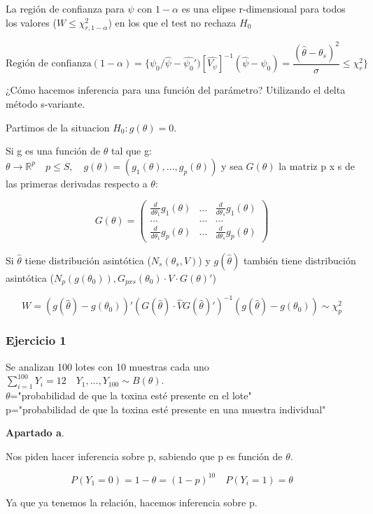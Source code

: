 La región de confianza para $\psi$ con $1-\alpha$ es una elipse r-dimensional para todos los valores ($W \leq \chi^2_{r,1-\alpha}$) en los que el test no rechaza $H_0$

\[
\text{Región de confianza}(1-\alpha)=\{ \psi_0 /\hat{\psi}-\hat{\psi_0}')[\hat{V_\psi}]^{-1}(\hat{\psi}-\psi_0)=\frac{(\hat{\theta}-\theta_s)^2}{\sigma}\leq\chi^2_r\}
\]

¿Cómo hacemos inferencia para una función del parámetro?
Utilizando el delta método s-variante.

Partimos de la situacion $H_0:g(\theta)=0$.

Si g es una función de $\theta$ tal que g:$\theta \to \mathbb{R}^p \quad p \leq S, \quad g(\theta)=(g_1(\theta),\dots,g_p(\theta))$
y sea $G(\theta)$ la matriz p x s de las primeras derivadas respecto a $\theta$:

\[
G(\theta)=
\begin{pmatrix}
    \frac{d}{d \theta_1} g_1(\theta) & \dots & \frac{d}{d \theta_s} g_1(\theta)\\
    \dots &\dots & \dots \\
    \frac{d}{d \theta_1} g_p(\theta) & \dots &\frac{d}{d \theta_s} g_p(\theta)
\end{pmatrix}
\]

Si $\hat{\theta}$ tiene distribución asintótica ($N_s(\theta_s,V)$)
y $g(\hat{\theta})$ también tiene distribución asintótica ($N_p(g(\theta_0)),G_{pxs}(\theta_0)\cdot V \cdot G(\theta)'$)

\[
W=(g(\hat{\theta})-g(\theta_0))'(G(\hat{\theta})\cdot \hat{V} G(\hat{\theta})')^{-1}(g(\hat{\theta})-g(\theta_0)) \sim \chi^2_p
\]

\subsubsection*{Ejercicio 1}
Se analizan 100 lotes con 10 muestras cada uno $\sum_{i=1}^{100}Y_i=12 \quad Y_1,\dots,Y_{100} \sim B(\theta)$.
\\$\theta$="probabilidad de que la toxina esté presente en el lote"
\\ p="probabilidad de que la toxina esté presente en una muestra individual"

\textbf{Apartado a}.

Nos piden hacer inferencia sobre p, sabiendo que p es función de $\theta$.

\[
P(Y_1=0)=1-\theta=(1-p)^{10} \quad P(Y_i=1)=\theta
\]

Ya que ya tenemos la relación, hacemos inferencia sobre p.

